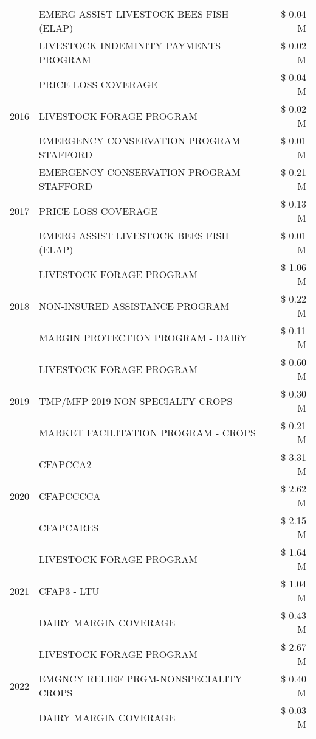 \begin{tabular}{llr}
 & EMERG ASSIST LIVESTOCK BEES FISH (ELAP) & \$ 0.04 M \\
 & LIVESTOCK INDEMINITY PAYMENTS PROGRAM & \$ 0.02 M \\
\cline{1-3}
\multirow[t]{3}{*}{2016} & PRICE LOSS COVERAGE & \$ 0.04 M \\
 & LIVESTOCK FORAGE PROGRAM & \$ 0.02 M \\
 & EMERGENCY CONSERVATION PROGRAM STAFFORD & \$ 0.01 M \\
\cline{1-3}
\multirow[t]{3}{*}{2017} & EMERGENCY CONSERVATION PROGRAM STAFFORD & \$ 0.21 M \\
 & PRICE LOSS COVERAGE & \$ 0.13 M \\
 & EMERG ASSIST LIVESTOCK BEES FISH (ELAP) & \$ 0.01 M \\
\cline{1-3}
\multirow[t]{3}{*}{2018} & LIVESTOCK FORAGE PROGRAM & \$ 1.06 M \\
 & NON-INSURED ASSISTANCE PROGRAM & \$ 0.22 M \\
 & MARGIN PROTECTION PROGRAM - DAIRY & \$ 0.11 M \\
\cline{1-3}
\multirow[t]{3}{*}{2019} & LIVESTOCK FORAGE PROGRAM & \$ 0.60 M \\
 & TMP/MFP 2019 NON SPECIALTY CROPS & \$ 0.30 M \\
 & MARKET FACILITATION PROGRAM - CROPS & \$ 0.21 M \\
\cline{1-3}
\multirow[t]{3}{*}{2020} & CFAPCCA2 & \$ 3.31 M \\
 & CFAPCCCCA & \$ 2.62 M \\
 & CFAPCARES & \$ 2.15 M \\
\cline{1-3}
\multirow[t]{3}{*}{2021} & LIVESTOCK FORAGE PROGRAM & \$ 1.64 M \\
 & CFAP3 - LTU & \$ 1.04 M \\
 & DAIRY MARGIN COVERAGE & \$ 0.43 M \\
\cline{1-3}
\multirow[t]{3}{*}{2022} & LIVESTOCK FORAGE PROGRAM & \$ 2.67 M \\
 & EMGNCY RELIEF PRGM-NONSPECIALITY CROPS & \$ 0.40 M \\
 & DAIRY MARGIN COVERAGE & \$ 0.03 M \\
\cline{1-3}
\bottomrule
\end{tabular}
